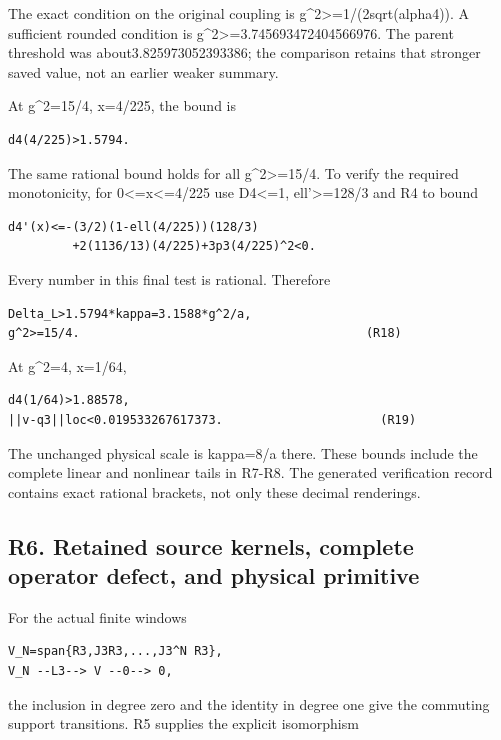 \documentclass[11pt,a4paper]{article}
\renewcommand{\[}{\begingroup\small\originaldisplaystart}
\renewcommand{\]}{\originaldisplayend\endgroup}
\begin{document}
The exact condition on the original coupling is
g\^{}2\textgreater=1/(2sqrt(alpha4)). A sufficient rounded condition is
g\^{}2\textgreater=3.745693472404566976. The parent threshold was
about3.825973052393386; the comparison retains that stronger saved
value, not an earlier weaker summary.

At g\^{}2=15/4, x=4/225, the bound is

\begin{verbatim}
d4(4/225)>1.5794.
\end{verbatim}

The same rational bound holds for all g\^{}2\textgreater=15/4. To verify
the required monotonicity, for 0\textless=x\textless=4/225 use
D4\textless=1, ell'\textgreater=128/3 and R4 to bound

\begin{verbatim}
d4'(x)<=-(3/2)(1-ell(4/225))(128/3)
         +2(1136/13)(4/225)+3p3(4/225)^2<0.
\end{verbatim}

Every number in this final test is rational. Therefore

\begin{verbatim}
Delta_L>1.5794*kappa=3.1588*g^2/a,
g^2>=15/4.                                        (R18)
\end{verbatim}

At g\^{}2=4, x=1/64,

\begin{verbatim}
d4(1/64)>1.88578,
||v-q3||loc<0.019533267617373.                      (R19)
\end{verbatim}

The unchanged physical scale is kappa=8/a there. These bounds include
the complete linear and nonlinear tails in R7-R8. The generated
verification record contains exact rational brackets, not only these
decimal renderings.

\subsection{R6. Retained source kernels, complete operator defect, and
physical
primitive}\label{r6.-retained-source-kernels-complete-operator-defect-and-physical-primitive}

For the actual finite windows

\begin{verbatim}
V_N=span{R3,J3R3,...,J3^N R3},
V_N --L3--> V --0--> 0,
\end{verbatim}

the inclusion in degree zero and the identity in degree one give the
commuting support transitions. R5 supplies the explicit isomorphism
\end{document}
